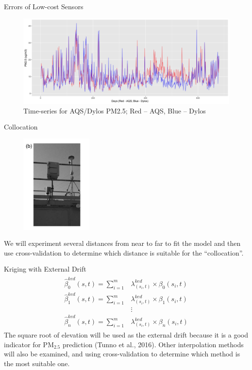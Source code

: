 \documentclass[handout]{beamer} %
\begin{document}
\begin{frame}{Errors of Low-cost Sensors}
    \begin{figure}
        \centering
        \includegraphics[width=\textwidth]{img/appendix/Aim2/time_series.jpg}
        \caption{Time-series for AQS/Dylos PM2.5; \textcolor[rgb]{1,0,0}{Red} -- AQS, \textcolor[rgb]{0,0,1}{Blue} -- Dylos}
    \end{figure}
\end{frame}

\begin{frame}{Collocation}
    \begin{figure}
        \centering
        \includegraphics[width=0.32\textwidth]{img/appendix/Aim2/collocation.png}
    \end{figure}
    We will experiment several distances from near to far to fit the model and then use cross-validation to determine which distance is suitable for the ``collocation''.
\end{frame}

\begin{frame}{Kriging with External Drift}
    \begin{align*}
        \begin{split}
        \hat{\beta}^{ked}_0(s,t)=\sum_{i=1}^m&\lambda^{ked}_{(s_i,t)}\times\beta_0(s_i,t) \\
        \hat{\beta}^{ked}_1(s,t)=\sum_{i=1}^m&\lambda^{ked}_{(s_i,t)}\times\beta_1(s_i,t) \\
        &\vdots \\
        \hat{\beta}^{ked}_n(s,t)=\sum_{i=1}^m&\lambda^{ked}_{(s_i,t)}\times\beta_n(s_i,t) 
        \end{split}
    \end{align*}
    \textcolor[rgb]{0.1,0.1,0.6}{\small The square root of elevation will be used as the external drift because it is a good indicator for PM$_{2.5}$ prediction (Tunno et al., 2016). Other interpolation methods will also be examined, and using cross-validation to determine which method is the most suitable one.}
\end{frame}
\end{document}
